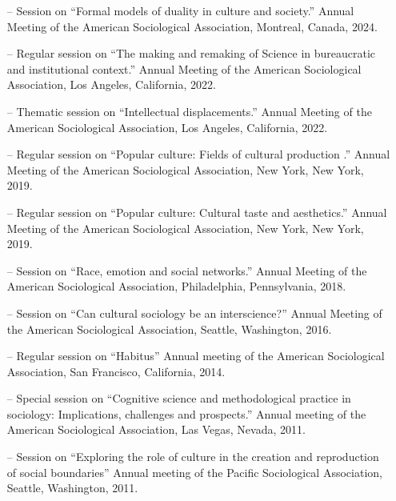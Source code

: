 
\begin{itemize}[itemsep=-0.5ex]
    \item[--] Session on ``Formal models of duality in culture and society.'' Annual Meeting of the American Sociological Association, Montreal, Canada, 2024.
    
    \item[--] Regular session on ``The making and remaking of Science in bureaucratic and institutional context.'' Annual Meeting of the American Sociological Association, Los Angeles, California, 2022.
    
    \item[--] Thematic session on ``Intellectual displacements.'' Annual Meeting of the American Sociological Association, Los Angeles, California, 2022.
    
    \item[--] Regular session on ``Popular culture: Fields of cultural production .'' Annual Meeting of the American Sociological Association, New York, New York, 2019.
    
    \item[--] Regular session on ``Popular culture: Cultural taste and aesthetics.'' Annual Meeting of the American Sociological Association, New York, New York, 2019.
    
    \item[--] Session on ``Race, emotion and social networks.'' Annual Meeting of the American Sociological Association, Philadelphia, Pennsylvania, 2018.
    
    \item[--] Session on  ``Can cultural sociology be an interscience?'' Annual Meeting of the American Sociological Association, Seattle, Washington, 2016.
    
    \item[--] Regular session on ``Habitus''   Annual meeting of the American Sociological Association, San Francisco, California, 2014.
    
    \item[--] Special session on ``Cognitive science and methodological practice in sociology: Implications, challenges and prospects.''  Annual meeting of the American Sociological Association, Las Vegas, Nevada, 2011.
    
    \item[--] Session on ``Exploring the role of culture in the creation and reproduction of social boundaries'' Annual meeting of the Pacific Sociological Association, Seattle, Washington, 2011.
    

\end{itemize}
